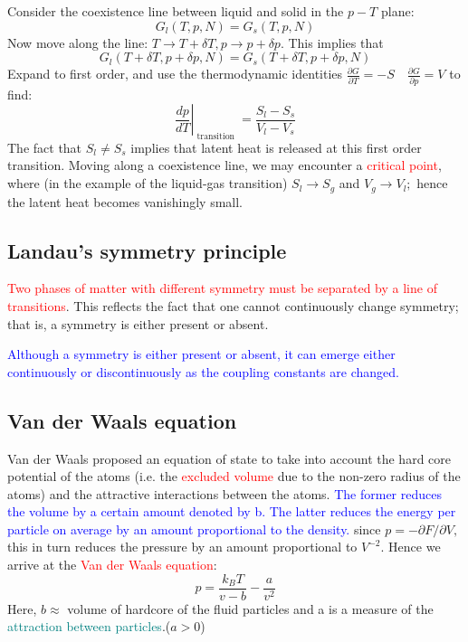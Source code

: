 \documentclass[12pt,titlepage]{article}
\newcommand{\redp}[1]{\textcolor{red}{#1}}
\newcommand{\bluep}[1]{\textcolor{blue}{#1}}
\newcommand{\tealp}[1]{\textcolor{teal}{#1}}
\numberwithin{equation}{section}
\begin{document}
Consider the coexistence line between liquid and solid in the $p-T$ plane:
\begin{equation}
G_{l}(T, p, N)=G_{s}(T, p, N)
\end{equation}
Now move along the line: $T \rightarrow T+\delta T, p \rightarrow p+\delta p .$ This implies that
\begin{equation}
G_{l}(T+\delta T, p+\delta p, N)=G_{s}(T+\delta T, p+\delta p, N)
\end{equation}
Expand to first order, and use the thermodynamic identities $\frac{\partial G}{\partial T}=-S \quad \frac{\partial G}{\partial p}=V$ to find:
\begin{equation}
\left. \frac{d p}{d T}\right|_{\text { transition }}=\frac{S_{l}-S_{s}}{V_{l}-V_{s}}
\end{equation}
The fact that $S_{l} \neq S_{s}$ implies that latent heat is released at this first order transition. Moving along a coexistence line, we may encounter a \redp{critical point}, where (in the example of the liquid-gas transition) $S_{l} \rightarrow S_{g}$ and $V_{g} \rightarrow V_{l} ;$ hence the latent heat becomes vanishingly small.

\subsection{Landau's symmetry principle}
\redp{Two phases of matter with different symmetry must be separated by a line of transitions}. This reflects the fact that one cannot continuously change symmetry; that is, a symmetry is either present or
absent.

\bluep{Although a symmetry is either present or absent, it can emerge either continuously or discontinuously as the coupling constants are changed.}

\subsection{Van der Waals equation}
Van der Waals proposed an equation of state to take into account the hard core potential of the atoms (i.e. the \redp{excluded volume} due to the non-zero radius of the atoms) and the attractive interactions between the atoms. \bluep{The former reduces the volume by a certain amount denoted by b. The latter reduces the energy per particle on average by an amount proportional to the density.} since $p=-\partial F / \partial V,$ this in turn reduces the pressure by an amount proportional to $V^{-2}$. Hence we arrive at the \redp{Van der Waals equation}:
\begin{equation}
p=\frac{k_{B} T}{v-b}-\frac{a}{v^{2}}
\end{equation}
Here, $b \approx$ volume of hardcore of the fluid particles and a is a measure of the \tealp{attraction between particles}.($a>0$)
\end{document}
